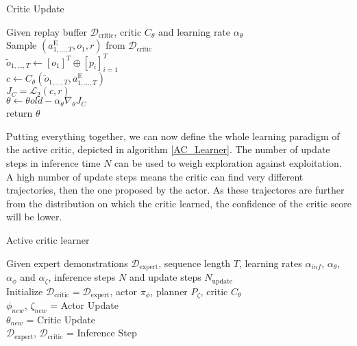 \begin{algorithm}
    \caption{Critic Update}
    \label{Critic_Update_Alg}
    \begin{algorithmic}
    \Require Given replay buffer $\mathcal{D}_{\text{critic}}$, critic $C_{\theta}$ and learning rate $\alpha_{\theta}$\\
    \State Sample $(a^{\text{E}}_{1, ..., T}, o_1, r)$ from $\mathcal{D}_{\text{critic}}$\\
    \State $\tilde{o}_{1, ..., T} \gets [o_1]^T \oplus [p_i]_{i=1}^T$ \hfill{} \\
    \State $c \gets C_{\theta}(\tilde{o}_{1, ..., T}, a^{\text{E}}_{1, ..., T})$\hfill{} \\
    
    \State $J_{C} = \mathcal{L}_2(c, r)$ \hfill{} \\
    \State $\theta \gets \theta{old} - \alpha_{\theta} \nabla_{\theta}J_{C}$\\
    \State return $\theta$
\end{algorithmic}
\end{algorithm}
Putting everything together, we can now define the whole learning paradigm of the active critic, depicted in algorithm \ref{AC_Learner}. The number of update 
steps in inference time $N$ can be used to weigh exploration against exploitation. A high number of update steps means the critic can find very different 
trajectories, then the one proposed by the actor. As these trajectores are further from the distribution on which the critic learned, the confidence of the 
critic score will be lower.
\begin{algorithm}
    \caption{Active critic learner}
    \label{AC_Learner}
    \begin{algorithmic}
    \Require Given expert demonstrations $\mathcal{D}_{\text{expert}}$, sequence length $T$, learning rates $\alpha_{inf}$, $\alpha_{\theta}$, 
    $\alpha_{\phi}$ and $\alpha_{\zeta}$, inference steps $N$ and update steps $N_{\text{update}}$\\
    \State Initialize  $\mathcal{D}_{\text{critic}} = \mathcal{D}_{\text{expert}}$, 
    actor $\pi_{\phi}$, planner $P_{\zeta}$, critic $C_{\theta}$\\
    {
        {
            $\phi_{new}$, $\zeta_{new}$ = Actor Update \hfill{}\\
            $\theta_{new}$ = Critic Update \hfill{}\\
        }
        {
           $\mathcal{D}_{\text{expert}}$, $\mathcal{D}_{\text{critic}}$ = Inference Step \hfill{}\\
        }
    }
    \end{algorithmic}
\end{algorithm}




